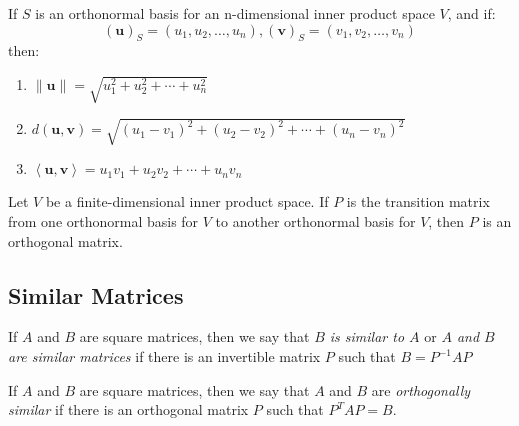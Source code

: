 \documentclass{report}
\begin{document}
		\begin{thm}
			If $S$ is an orthonormal basis for an n-dimensional inner product space $V$, and if:
			\begin{displaymath}
				(\bm{u})_S=(u_1,u_2,\dots,u_n), (\bm{v})_S=(v_1,v_2,\dots,v_n)
			\end{displaymath}
			then:
			\begin{enumerate}
				\item $\|\bm{u}\|=\sqrt{u_1^2+u_2^2+\cdots+u_n^2}$
				\item $d(\bm{u},\bm{v})=\sqrt{(u_1-v_1)^2+(u_2-v_2)^2+\cdots+(u_n-v_n)^2}$
				\item $\left<\bm{u},\bm{v}\right>=u_1v_1+u_2v_2+\cdots+u_nv_n$
			\end{enumerate}
		\end{thm}
		
		\begin{thm}
			Let $V$ be a finite-dimensional inner product space. If $P$ is the transition matrix from one orthonormal basis for $V$ to another orthonormal basis for $V$, then $P$ is an orthogonal matrix.
		\end{thm}
		
		\subsection{Similar Matrices}
		\begin{defn}
			If $A$ and $B$ are square matrices, then we say that \emph{$B$ is similar to $A$} or \emph{$A$ and $B$ are similar matrices} if there is an invertible matrix $P$ such that $B=P^{-1}AP$
		\end{defn}
		
		\begin{defn}
			If $A$ and $B$ are square matrices, then we say that $A$ and $B$ are \emph{orthogonally similar} if there is an orthogonal matrix $P$ such that $P^TAP=B$.
		\end{defn}
		
\end{document}
